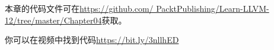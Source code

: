 本章的代码文件可在\url{https://github.com/
PacktPublishing/Learn-LLVM-12/tree/master/Chapter04}获取。\par

你可以在视频中找到代码\url{https://bit.ly/3nllhED}\par